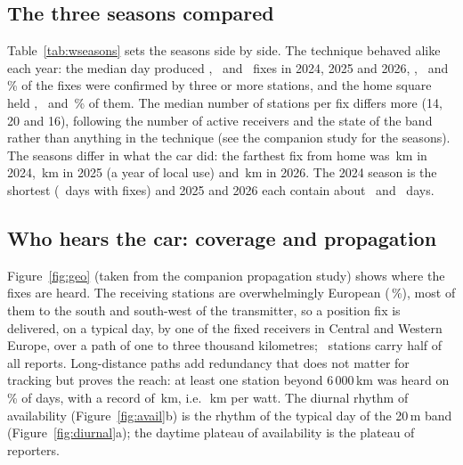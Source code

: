 \documentclass[10pt,a4paper]{article}
\begin{document}
\subsection{The three seasons compared}
Table~\ref{tab:wseasons} sets the seasons side by side. The technique behaved alike each year: the median day produced \sCACEPerDay, \sCACFPerDay\ and \sCACGPerDay\ fixes in 2024, 2025 and 2026, \sCACERepD, \sCACFRepD\ and \sCACGRepD\,\% of the fixes were confirmed by three or more stations, and the home square held \sCACEHome, \sCACFHome\ and \sCACGHome\,\% of them. The median number of stations per fix differs more (14, 20 and 16), following the number of active receivers and the state of the band rather than anything in the technique (see the companion study for the seasons). The seasons differ in what the car did: the farthest fix from home was \sCACEMax\,km in 2024, \sCACFMax\,km in 2025 (a year of local use) and \sCACGMax\,km in 2026. The 2024 season is the shortest (\sCACEDays\ days with fixes) and 2025 and 2026 each contain about \sCACFDays\ and \sCACGDays\ days.



\subsection{Who hears the car: coverage and propagation}
\label{sec:cov}
Figure~\ref{fig:geo} (taken from the companion propagation study) shows where the fixes are heard. The receiving stations are overwhelmingly European (\zpeurope\,\%), most of them to the south and south-west of the transmitter, so a position fix is delivered, on a typical day, by one of the fixed receivers in Central and Western Europe, over a path of one to three thousand kilometres; \halfStations\ stations carry half of all reports. Long-distance paths add redundancy that does not matter for tracking but proves the reach: at least one station beyond 6\,000\,km was heard on \pctDaysDXsix\,\% of days, with a record of \wRecord\,km, i.e.\ \wKmW\,km per watt. The diurnal rhythm of availability (Figure~\ref{fig:avail}b) is the rhythm of the typical day of the 20\,m band (Figure~\ref{fig:diurnal}a); the daytime plateau of availability is the plateau of reporters.

\end{document}
